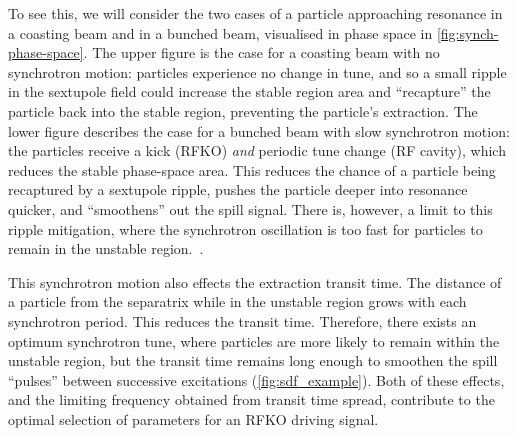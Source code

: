 \documentclass[a4paper,twoside,11pt]{report}
\begin{document}
To see this, we will consider the two cases of a particle approaching resonance in a coasting beam and in a bunched beam, visualised in phase space in \autoref{fig:synch-phase-space}. The upper figure is the case for a coasting beam with no synchrotron motion: particles experience no change in tune, and so a small ripple in the sextupole field could increase the stable region area and ``recapture'' the particle back into the stable region, preventing the particle's extraction. The lower figure describes the case for a bunched beam with slow synchrotron motion: the particles receive a kick (RFKO) \textit{and} periodic tune change (RF cavity), which reduces the stable phase-space area. This reduces the chance of a particle being recaptured by a sextupole ripple, pushes the particle deeper into resonance quicker, and ``smoothens'' out the spill signal. There is, however, a limit to this ripple mitigation, where the synchrotron oscillation is too fast for particles to remain in the unstable region.~\cite{Sorge_2018,PhysRevAccelBeams.26.014402}.

This synchrotron motion also effects the extraction transit time. The distance of a particle from the separatrix while in the unstable region grows with each synchrotron period. This reduces the transit time. Therefore, there exists an optimum synchrotron tune, where particles are more likely to remain within the unstable region, but the transit time remains long enough to smoothen the spill ``pulses'' between successive excitations (\autoref{fig:sdf_example}). Both of these effects, and the limiting frequency obtained from transit time spread, contribute to the optimal selection of parameters for an RFKO driving signal.
\end{document}
